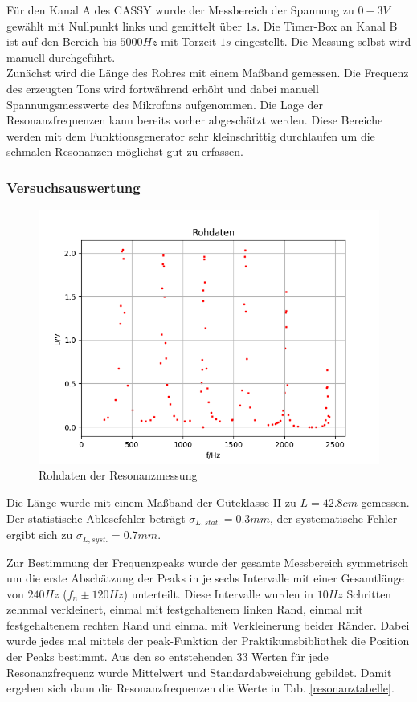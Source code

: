 \documentclass[12pt,a4paper]{article}
\begin{document}
Für den Kanal A des CASSY wurde der Messbereich der Spannung zu $0-3V$ gewählt mit Nullpunkt links und gemittelt über $1s$.
Die Timer-Box an Kanal B ist auf den Bereich bis $5000Hz$ mit Torzeit $1s$ eingestellt. Die Messung selbst wird manuell durchgeführt.\\

Zunächst wird die Länge des Rohres mit einem Maßband gemessen.
Die Frequenz des erzeugten Tons wird fortwährend erhöht und dabei manuell Spannungsmesswerte des Mikrofons aufgenommen. Die Lage der Resonanzfrequenzen kann bereits vorher abgeschätzt werden. Diese Bereiche werden mit dem Funktionsgenerator sehr kleinschrittig durchlaufen um die schmalen Resonanzen möglichst gut zu erfassen.

\subsubsection{Versuchsauswertung}
\begin{figure}
	\includegraphics[width=\linewidth]{rohres}
	\caption{Rohdaten der Resonanzmessung}
	\label{fig:rohresonanz}
\end{figure}
Die Länge wurde mit einem Maßband der Güteklasse II zu $L=42.8cm$ gemessen. Der statistische Ablesefehler beträgt $\sigma_{L,stat.}=0.3mm$, der systematische Fehler ergibt sich zu $\sigma_{L,syst.}=0.7mm$.

Zur Bestimmung der Frequenzpeaks wurde der gesamte Messbereich symmetrisch um die erste Abschätzung der Peaks in je sechs Intervalle mit einer Gesamtlänge von $240Hz$ ($f_n \pm 120Hz$) unterteilt. Diese Intervalle wurden in $10Hz$ Schritten zehnmal verkleinert, einmal mit festgehaltenem linken Rand, einmal mit festgehaltenem rechten Rand und einmal mit Verkleinerung beider Ränder. Dabei wurde jedes mal mittels der peak-Funktion der Praktikumsbibliothek die Position der Peaks bestimmt. Aus den so entstehenden 33 Werten für jede Resonanzfrequenz wurde Mittelwert und Standardabweichung gebildet. Damit ergeben sich dann die Resonanzfrequenzen die Werte in Tab. \ref{resonanztabelle}.\\
\end{document}
